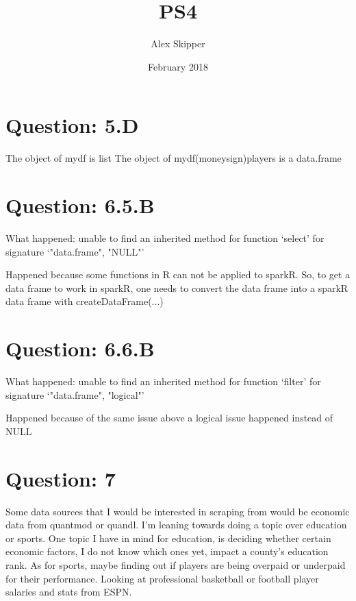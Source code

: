 \documentclass{article}
\title{PS4}
\author{Alex Skipper }
\date{February 2018}
\begin{document}
\maketitle


\section{Question: 5.D}
The object of mydf is list 
The object of mydf(moneysign)players is a data.frame

\section{Question: 6.5.B}
What happened: unable to find an inherited method for function ‘select’ for signature ‘"data.frame", "NULL"’

Happened because some functions in R can not be applied to sparkR. So, to get a data frame to work in sparkR, one needs to convert the data frame into a sparkR data frame with createDataFrame(...)

\section{Question: 6.6.B}
What happened: unable to find an inherited method for function ‘filter’ for signature ‘"data.frame", "logical"’

Happened because of the same issue above a logical issue happened instead of NULL

\section{Question: 7}
Some data sources that I would be interested in scraping from would be economic data from quantmod or quandl. I'm leaning towards doing a topic over education or sports. One topic I have in mind for education, is deciding whether certain economic factors, I do not know which ones yet, impact a county's education rank. As for sports, maybe finding out if players are being overpaid or underpaid for their performance. Looking at professional basketball or football player salaries and stats from ESPN.
\end{document}
